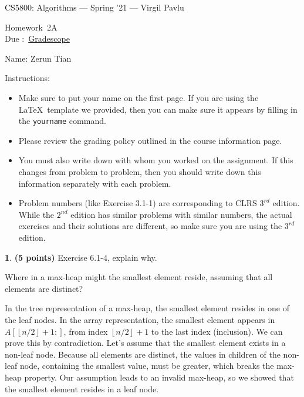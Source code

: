\documentclass[11pt]{article}
\newcommand{\yourname}{Zerun Tian}
\newcommand{\floor}[1]{\left\lfloor #1 \right\rfloor}
\theoremstyle{definition}
\newcommand{\instructor}{Virgil Pavlu}
\newcommand{\hwnum}{2A}
\newcommand{\hwdue}{\href{https://gradescope.com/courses/229309}{Gradescope}}
\theoremstyle{theorem}
\newtheorem{prob}{}
\newcommand{\solution}{\medskip\noindent{\color{DarkBlue}\textbf{Solution:}}}
\begin{document}
{\Large 
\begin{center}{CS5800: Algorithms} --- Spring '21 --- \instructor \end{center}}
{\large
\vspace{10pt}
\noindent Homework~\hwnum \vspace{2pt}\\
Due :~\hwdue}

\bigskip
{\large \noindent Name: \yourname }

\vspace{15pt}

{\large \noindent Instructions:}

\begin{itemize}

\item Make sure to put your name on the first page.  If you are using the \LaTeX~template we provided, then you can make sure it appears by filling in the \texttt{yourname} command.

\item Please review the grading policy outlined in the course information page.

\item You must also write down with whom you worked on the assignment.  If this changes from problem to problem, then you should write down this information separately with each problem.

\item Problem numbers (like Exercise 3.1-1) are corresponding to CLRS $3^{rd}$ edition.  While the  $2^{nd}$ edition  has  similar  problems  with  similar  numbers,  the  actual  exercises  and their solutions are different, so make sure you are using the $3^{rd}$ edition.

\end{itemize}

\newpage

\begin{prob} \textbf{(5 points)} Exercise 6.1-4, explain why.

Where in a max-heap might the smallest element reside, assuming that all elements are distinct?

\solution

In the tree representation of a max-heap, the smallest element resides in one of the leaf nodes. In the array representation, the smallest element appears in $A[\floor{n/2} + 1:]$, from index $\floor{n/2}+1$ to the last index (inclusion). We can prove this by contradiction. Let's assume that the smallest element exists in a non-leaf node. Because all elements are distinct, the values in children of the non-leaf node, containing the smallest value, must be greater, which breaks the max-heap property. Our assumption leads to an invalid max-heap, so we showed that the smallest element resides in a leaf node.
\end{prob}
\end{document}
